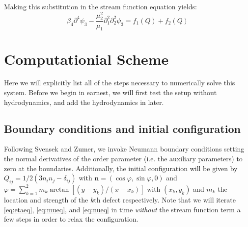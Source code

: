 \documentclass[reqno]{article}
\begin{document}
	Making this substitution in the stream function equation yields:
	\begin{equation} \label{eq:streamfuncsimp}
		\beta_4 \partial^4 \psi_3 - \frac{\mu_2^2}{\mu_1} \partial_1^2\partial_2^2 \psi_3 = f_1(Q) + f_2(Q)
	\end{equation}
	
	\section{Computationial Scheme}
	Here we will explicitly list all of the steps necessary to numerically solve this system. Before we begin in earnest, we will first test the setup without hydrodynamics, and add the hydrodynamics in later. 
	
	\subsection{Boundary conditions and initial configuration}
	Following Svensek and Zumer, we invoke Neumann boundary conditions setting the normal derivatives of the order parameter (i.e. the auxiliary parameters) to zero at the boundaries. Additionally, the initial configuration will be given by $Q_{ij} = 1/2(3n_in_j - \delta_{ij})$ with $\mathbf{n} = (\cos\varphi, \sin\varphi, 0)$ and $\varphi = \sum_{k=1}^2 m_k\arctan\left[ (y - y_k)/(x - x_k) \right]$ with $(x_k, y_k)$ and $m_k$ the location and strength of the $k$th defect respectively. Note that we will iterate \eqref{eq:etaeq}, \eqref{eq:mueq}, and \eqref{eq:nueq} in time \textit{without} the stream function term a few steps in order to relax the configuration. 
	
\end{document}
